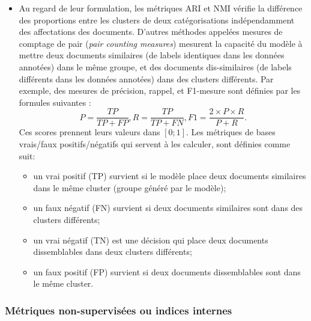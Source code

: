 \begin{itemize}
	\item Au regard de leur formulation, les métriques ARI et NMI vérifie la différence des proportions entre les clusters de deux catégorisations indépendamment des affectations des documents. D'autres méthodes appelées mesures de comptage de pair (\textit{pair counting measures}) mesurent la capacité du modèle à mettre deux documents similaires (de labels identiques dans les données annotées) dans le même groupe, et des documents dis-similaires (de labels différents dans les données annotées) dans des clusters différents. Par exemple, des mesures de précision, rappel, et F1-mesure sont définies par les formules suivantes \citep{manning2009irbook-flatclustering}:
	\[P = \frac{{TP}}{{TP} + {FP}}, R = \frac{{TP}}{{TP} + {FN}}, F1 = \frac{2 \times P \times R}{P + R}.\]
	Ces scores prennent leurs valeurs dans $[0;1]$. Les métriques de bases vrais/faux positifs/négatifs qui servent à les calculer, sont définies comme suit:
	\begin{itemize}
		\item un vrai positif (TP) survient si le modèle place deux documents similaires dans le même cluster (groupe généré par le modèle);
		\item un faux négatif (FN) survient si deux documents similaires sont dans des clusters différents;
		\item un vrai négatif (TN) est une décision qui place deux documents dissemblables dans deux clusters différents;
		\item un faux positif (FP) survient si deux documents dissemblables sont dans le même cluster.
	\end{itemize}
		
\end{itemize}



\subsubsection{Métriques non-supervisées ou indices internes}
\label{sec:similarite:biblio:unsupeval}

